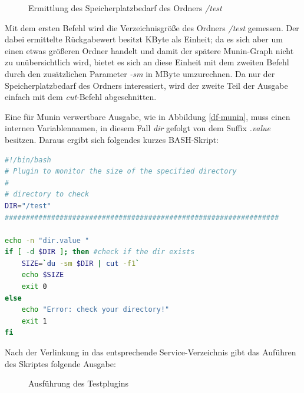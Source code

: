 \begin{figure}[ht]
	\centering
		\caption{Ermittlung des Speicherplatzbedarf des Ordners \textit{/test}}
		\label{du1}
\end{figure}

Mit dem ersten Befehl wird die Verzeichnisgröße des Ordners \textit{/test} gemessen.
Der dabei ermittelte Rückgabewert besitzt KByte als Einheit; da es sich aber um einen etwas größeren Ordner handelt und damit der spätere Munin-Graph nicht zu unübersichtlich wird, bietet es sich an diese Einheit mit dem zweiten Befehl durch den zusätzlichen Parameter \textit{-sm} in MByte umzurechnen.
Da nur der Speicherplatzbedarf des Ordners interessiert, wird der zweite Teil der Ausgabe einfach mit dem \textit{cut}-Befehl abgeschnitten.

Eine für Munin verwertbare Ausgabe, wie in Abbildung \ref{df-munin}, muss einen internen Variablennamen, in diesem Fall \textit{dir}  gefolgt von dem Suffix \textit{.value} besitzen.
Daraus ergibt sich folgendes kurzes BASH-Skript:

\begin{lstlisting}[captionpos=b, caption=Speicherplatzbedarf eines Verzeichnisses, label=du, breaklines = true, language=bash]
#!/bin/bash
# Plugin to monitor the size of the specified directory
#
# directory to check
DIR="/test"
#################################################################

echo -n "dir.value "
if [ -d $DIR ]; then #check if the dir exists
    SIZE=`du -sm $DIR | cut -f1`
    echo $SIZE
    exit 0
else
    echo "Error: check your directory!"
    exit 1
fi
\end{lstlisting}

Nach der Verlinkung in das entsprechende Service-Verzeichnis gibt das Auführen des Skriptes folgende Ausgabe:

\begin{figure}[ht]
	\centering
		\caption{Ausführung des Testplugins}
		\label{du2}
\end{figure}

